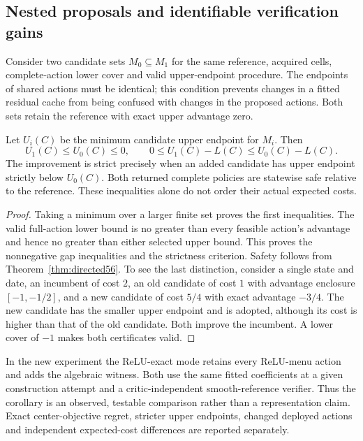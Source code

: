 \subsection{Nested proposals and identifiable verification gains}
Consider two candidate sets $M_0\subseteq M_1$ for the same reference, acquired cells, complete-action lower cover and valid upper-endpoint procedure. The endpoints of shared actions must be identical; this condition prevents changes in a fitted residual cache from being confused with changes in the proposed actions. Both sets retain the reference with exact upper advantage zero.

\begin{corollary}\label{cor:nested57}
Let $U_i(C)$ be the minimum candidate upper endpoint for $M_i$. Then
\[
 U_1(C)\le U_0(C)\le0,\qquad
 0\le U_1(C)-L(C)\le U_0(C)-L(C).
\]
The improvement is strict precisely when an added candidate has upper endpoint strictly below $U_0(C)$. Both returned complete policies are statewise safe relative to the reference. These inequalities alone do not order their actual expected costs.
\end{corollary}
\begin{proof}
Taking a minimum over a larger finite set proves the first inequalities. The valid full-action lower bound is no greater than every feasible action's advantage and hence no greater than either selected upper bound. This proves the nonnegative gap inequalities and the strictness criterion. Safety follows from Theorem~\ref{thm:directed56}. To see the last distinction, consider a single state and date, an incumbent of cost $2$, an old candidate of cost $1$ with advantage enclosure $[-1,-1/2]$, and a new candidate of cost $5/4$ with exact advantage $-3/4$. The new candidate has the smaller upper endpoint and is adopted, although its cost is higher than that of the old candidate. Both improve the incumbent. A lower cover of $-1$ makes both certificates valid.
\end{proof}

In the new experiment the ReLU-exact mode retains every ReLU-menu action and adds the algebraic witness. Both use the same fitted coefficients at a given construction attempt and a critic-independent smooth-reference verifier. Thus the corollary is an observed, testable comparison rather than a representation claim. Exact center-objective regret, stricter upper endpoints, changed deployed actions and independent expected-cost differences are reported separately.

